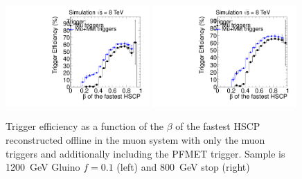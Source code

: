 

\begin{figure}
\centering
  \includegraphics[clip=true, trim=0.0cm 0cm 3.0cm 0cm, width=0.49\textwidth]{figures/search/Gluino_8TeV_M1200_f10MatchedSA}
  \includegraphics[clip=true, trim=0.0cm 0cm 3.0cm 0cm, width=0.49\textwidth]{figures/search/Stop_8TeV_M800MatchedSA}
      \caption[Trigger efficiency as a function of the $\beta$ of the fastest HSCP reconstructed offline in the muon system with only the muon triggers
and additionally including the PFMET trigger.]
{Trigger efficiency as a function of the $\beta$ of the fastest HSCP reconstructed offline in the muon system with only the muon triggers
and additionally including the PFMET trigger.
Sample is 1200~GeV Gluino $f=0.1$ (left) and 800~GeV stop (right)}
    \label{fig:TriggerEffVsBetaGl}
\end{figure}

